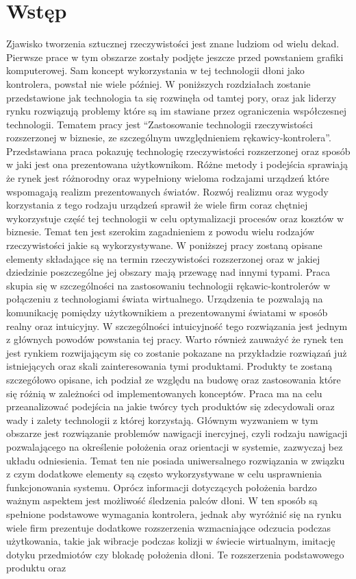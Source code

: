 \chapter*{Wstęp}
\label{ch:wstep}
Zjawisko tworzenia sztucznej rzeczywistości jest znane ludziom od wielu dekad. Pierwsze prace w tym obszarze zostały podjęte jeszcze przed powstaniem grafiki komputerowej. Sam koncept wykorzystania w tej technologii dłoni jako kontrolera, powstał nie wiele później. W poniższych rozdziałach zostanie przedstawione jak technologia ta się  rozwinęła od tamtej pory, oraz jak liderzy rynku rozwiązują problemy które są im stawiane przez ograniczenia współczesnej technologii. Tematem pracy jest ``Zastosowanie technologii rzeczywistości rozszerzonej w biznesie, ze szczególnym uwzględnieniem rękawicy-kontrolera''. Przedstawiana praca pokazuję technologię rzeczywistości rozszerzonej oraz sposób w jaki jest ona prezentowana użytkownikom. Różne metody i podejścia sprawiają że rynek jest różnorodny oraz wypełniony wieloma rodzajami urządzeń które wspomagają realizm prezentowanych światów. Rozwój realizmu oraz wygody korzystania z tego rodzaju urządzeń sprawił że wiele firm coraz chętniej wykorzystuje część tej technologii w celu optymalizacji procesów oraz kosztów w biznesie. Temat ten jest szerokim zagadnieniem z powodu wielu rodzajów rzeczywistości jakie są wykorzystywane. W poniższej pracy zostaną opisane elementy składające się na termin rzeczywistości rozszerzonej oraz w jakiej dziedzinie poszczególne jej obszary mają przewagę nad innymi typami. Praca skupia się w szczególności na zastosowaniu technologii rękawic-kontrolerów w połączeniu z technologiami świata wirtualnego. Urządzenia te pozwalają na komunikację pomiędzy użytkownikiem a prezentowanymi światami w sposób realny oraz intuicyjny. W szczególności intuicyjność tego rozwiązania jest jednym z głównych powodów powstania tej pracy. Warto również zauważyć że rynek ten jest rynkiem rozwijającym się co zostanie pokazane na przykładzie rozwiązań już istniejących oraz skali zainteresowania tymi produktami. Produkty te zostaną szczegółowo opisane, ich podział ze względu na budowę oraz zastosowania które się różnią w zależności od implementowanych konceptów. Praca ma na celu przeanalizować podejścia na jakie twórcy tych produktów się zdecydowali oraz wady i zalety technologii z której korzystają. Głównym wyzwaniem w tym obszarze jest rozwiązanie problemów nawigacji inercyjnej, czyli rodzaju nawigacji pozwalającego na określenie położenia oraz orientacji w systemie, zazwyczaj bez układu odniesienia. Temat ten nie posiada uniwersalnego rozwiązania w związku z czym dodatkowe elementy są często wykorzystywane w celu usprawnienia funkcjonowania systemu. Oprócz informacji dotyczących położenia bardzo ważnym aspektem jest możliwość śledzenia palców dłoni. W ten sposób są spełnione podstawowe wymagania kontrolera, jednak aby wyróżnić się na rynku wiele firm prezentuje dodatkowe rozszerzenia wzmacniające odczucia podczas użytkowania, takie jak wibracje podczas kolizji w świecie wirtualnym, imitację dotyku przedmiotów czy blokadę położenia dłoni. Te rozszerzenia podstawowego produktu oraz 